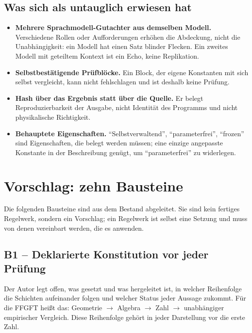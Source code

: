 \subsection{Was sich als untauglich erwiesen hat}

\begin{itemize}
\item \textbf{Mehrere Sprachmodell-Gutachter aus demselben Modell.} Verschiedene Rollen
  oder Aufforderungen erhöhen die Abdeckung, nicht die Unabhängigkeit: ein Modell hat einen
  Satz blinder Flecken. Ein zweites Modell mit geteiltem Kontext ist ein Echo, keine
  Replikation.
\item \textbf{Selbstbestätigende Prüfblöcke.} Ein Block, der eigene Konstanten mit sich selbst
  vergleicht, kann nicht fehlschlagen und ist deshalb keine Prüfung.
\item \textbf{Hash über das Ergebnis statt über die Quelle.} Er belegt Reproduzierbarkeit der
  Ausgabe, nicht Identität des Programms und nicht physikalische Richtigkeit.
\item \textbf{Behauptete Eigenschaften.} \enquote{Selbstverwaltend}, \enquote{parameterfrei},
  \enquote{frozen} sind Eigenschaften, die belegt werden müssen; eine einzige angepasste
  Konstante in der Beschreibung genügt, um \enquote{parameterfrei} zu widerlegen.
\end{itemize}

\section{Vorschlag: zehn Bausteine}

Die folgenden Bausteine sind aus dem Bestand abgeleitet. Sie sind kein fertiges
Regelwerk, sondern ein Vorschlag; ein Regelwerk ist selbst eine Setzung und muss von
denen vereinbart werden, die es anwenden.

\subsection*{B1 -- Deklarierte Konstitution vor jeder Prüfung}
Der Autor legt offen, was gesetzt und was hergeleitet ist, in welcher Reihenfolge die
Schichten aufeinander folgen und welcher Status jeder Aussage zukommt. Für die FFGFT
heißt das: Geometrie $\to$ Algebra $\to$ Zahl $\to$ unabhängiger empirischer Vergleich.
Diese Reihenfolge gehört in jeder Darstellung vor die erste Zahl.

